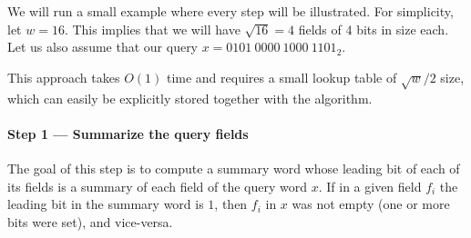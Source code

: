 We will run a small example where every step will be illustrated. For simplicity, let $w=16$. This implies that we will have $\sqrt{16} = 4$ fields of $4$ bits in size each. Let us also assume that our query $x = 0101\ 0000\ 1000\ 1101_2$.

This approach takes $O(1)$ time and requires a small lookup table of $\sqrt{w}/2$ size, which can easily be explicitly stored together with the algorithm.

\paragraph{Step 1 --- Summarize the query fields} \label{sec:summaryfields}

The goal of this step is to compute a summary word whose leading bit of each of its fields is a summary of each field of the query word $x$. If in a given field $f_i$ the leading bit in the summary word is $1$, then $f_i$ in $x$ was not empty (one or more bits were set), and vice-versa.

